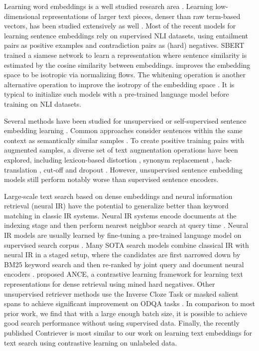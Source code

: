 \documentclass[nohyperref]{article}
\begin{document}
\begin{table}[]
Learning word embeddings is a well studied research area \cite{brown,Gutmann,mikolov,pennington}. Learning low-dimensional representations of larger text pieces, denser than raw term-based vectors, has been studied extensively as well \cite{deerwester,contrastive}. Most of the recent models for learning sentence embeddings rely on supervised NLI datasets, using entailment pairs as positive examples and contradiction pairs as (hard) negatives. SBERT \cite{sbert} trained a siamese network to learn a representation where sentence similarity is estimated by the cosine similarity between embeddings. \citet{Li} improves the embedding space to be isotropic via normalizing flows. The whitening operation is another alternative operation to improve the isotropy of the embedding space \cite{Su}. It is typical to initialize such models with a pre-trained language model \cite{bert} before training on NLI datasets.

Several methods have been studied for unsupervised or self-supervised sentence embedding learning \cite{Logeswaran,Zhang,simcse}. Common approaches consider sentences within the same context as semantically similar samples \cite{Kiros,Logeswaran}. To create positive training pairs with augmented samples, a diverse set of text augmentation operations have been explored, including lexicon-based distortion \cite{Wei}, synonym replacement \cite{Kobayashi}, back-translation \cite{Fang}, cut-off \cite{Shen} and dropout \cite{simcse}. However, unsupervised sentence embedding models still perform notably worse than supervised sentence encoders.

Large-scale text search based on dense embeddings and neural information retrieval (neural IR) have the potential to generalize better than keyword matching in classic IR systems. Neural IR systems encode documents at the indexing stage and then perform nearest neighbor search \cite{Johnson} at query time \cite{Lin}. Neural IR models are usually learned by fine-tuning a pre-trained language model on supervised search corpus \cite{ORQA,REALM,Karpukhin,Lewis}. Many SOTA search models combine classical IR with neural IR in a staged setup, where the candidates are first narrowed down by BM25 keyword search \cite{bm25} and then re-ranked by joint query and document neural encoders \cite{Nogueira,Qu}. \citet{Xiong} proposed ANCE, a contrastive learning framework for learning text representations for dense retrieval using mined hard negatives.  Other unsupervised retriever methods use the Inverse Cloze Task or masked salient spans to achieve significant improvement on ODQA tasks \cite{e2e}. In comparison to most prior work, we find that with a large enough batch size, it is possible to achieve good search performance without using supervised data. Finally, the recently published Contriever \cite{contreiver} is most similar to our work on learning text embeddings for text search using contrastive learning on unlabeled data.  


\end{table}
\end{document}

